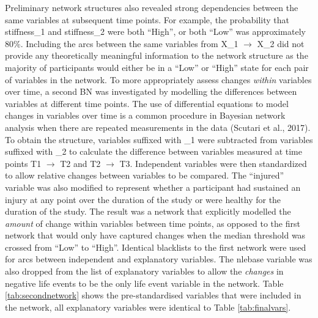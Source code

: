 \documentclass[
  english,
  man,floatsintext]{apa6}
\begin{document}
Preliminary network structures also revealed strong dependencies between the same variables at subsequent time points.
For example, the probability that stiffness\_1 and stiffness\_2 were both \enquote{High}, or both \enquote{Low} was approximately 80\%.
Including the arcs between the same variables from X\_1 \(\rightarrow\) X\_2 did not provide any theoretically meaningful information to the network structure as the majority of participants would either be in a \enquote{Low} or \enquote{High} state for each pair of variables in the network.
To more appropriately assess changes \emph{within} variables over time, a second BN was investigated by modelling the differences between variables at different time points.
The use of differential equations to model changes in variables over time is a common procedure in Bayesian network analysis when there are repeated measurements in the data (Scutari et al., 2017).
To obtain the structure, variables suffixed with \_1 were subtracted from variables suffixed with \_2 to calculate the difference between variables measured at time points T1 \(\rightarrow\) T2 and T2 \(\rightarrow\) T3.
Independent variables were then standardized to allow relative changes between variables to be compared.
The \enquote{injured} variable was also modified to represent whether a participant had sustained an injury at any point over the duration of the study or were healthy for the duration of the study.
The result was a network that explicitly modelled the \emph{amount} of change within variables between time points, as opposed to the first network that would only have captured changes when the median threshold was crossed from \enquote{Low} to \enquote{High}.
Identical blacklists to the first network were used for arcs between independent and explanatory variables.
The nlebase variable was also dropped from the list of explanatory variables to allow the \emph{changes} in negative life events to be the only life event variable in the network.
Table \ref{tab:secondnetwork} shows the pre-standardised variables that were included in the network, all explanatory variables were identical to Table \ref{tab:finalvars}.
\end{document}
